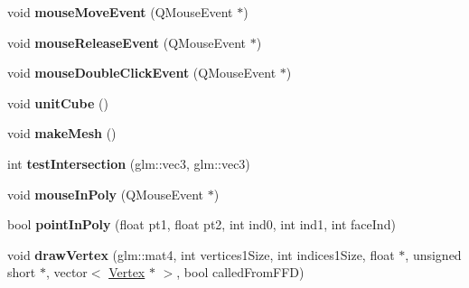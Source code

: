 \begin{DoxyCompactItemize}
\item 
\hypertarget{class_my_g_l_widget_ac6f3e3d95c1d8b22325437d925812212}{void {\bfseries mouse\-Move\-Event} (Q\-Mouse\-Event $\ast$)}\label{class_my_g_l_widget_ac6f3e3d95c1d8b22325437d925812212}

\item 
\hypertarget{class_my_g_l_widget_a25b2be743ef0f9a7b8ce1cdc9c323245}{void {\bfseries mouse\-Release\-Event} (Q\-Mouse\-Event $\ast$)}\label{class_my_g_l_widget_a25b2be743ef0f9a7b8ce1cdc9c323245}

\item 
\hypertarget{class_my_g_l_widget_a39f1b08d3c6692672de88ec602b1804a}{void {\bfseries mouse\-Double\-Click\-Event} (Q\-Mouse\-Event $\ast$)}\label{class_my_g_l_widget_a39f1b08d3c6692672de88ec602b1804a}

\item 
\hypertarget{class_my_g_l_widget_ac6a132482e243c792884217f1027d1db}{void {\bfseries unit\-Cube} ()}\label{class_my_g_l_widget_ac6a132482e243c792884217f1027d1db}

\item 
\hypertarget{class_my_g_l_widget_a4eb5ca42c3daab86051f2f472645598a}{void {\bfseries make\-Mesh} ()}\label{class_my_g_l_widget_a4eb5ca42c3daab86051f2f472645598a}

\item 
\hypertarget{class_my_g_l_widget_a20f9f760037e54e0a5b4aa3265672680}{int {\bfseries test\-Intersection} (glm\-::vec3, glm\-::vec3)}\label{class_my_g_l_widget_a20f9f760037e54e0a5b4aa3265672680}

\item 
\hypertarget{class_my_g_l_widget_adbba76603a72a49448ca50ce46087cec}{void {\bfseries mouse\-In\-Poly} (Q\-Mouse\-Event $\ast$)}\label{class_my_g_l_widget_adbba76603a72a49448ca50ce46087cec}

\item 
\hypertarget{class_my_g_l_widget_a1e0eae877ff22576e7748e951dc8d6a0}{bool {\bfseries point\-In\-Poly} (float pt1, float pt2, int ind0, int ind1, int face\-Ind)}\label{class_my_g_l_widget_a1e0eae877ff22576e7748e951dc8d6a0}

\item 
\hypertarget{class_my_g_l_widget_ae28a53e0674ac969f699d7ea56edda33}{void {\bfseries draw\-Vertex} (glm\-::mat4, int vertices1\-Size, int indices1\-Size, float $\ast$, unsigned short $\ast$, vector$<$ \hyperlink{class_vertex}{Vertex} $\ast$ $>$, bool called\-From\-F\-F\-D)}\label{class_my_g_l_widget_ae28a53e0674ac969f699d7ea56edda33}


\end{DoxyCompactItemize}

